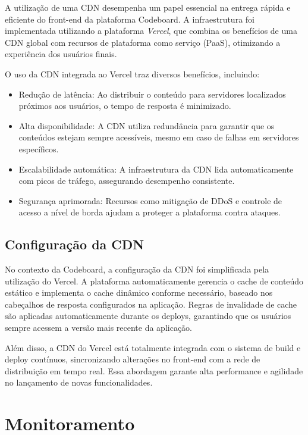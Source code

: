 A utilização de uma CDN desempenha um papel essencial na entrega rápida e eficiente do front-end da plataforma Codeboard. A infraestrutura foi implementada utilizando a plataforma \emph{Vercel}, que combina os benefícios de uma CDN global com recursos de plataforma como serviço (PaaS), otimizando a experiência dos usuários finais.

O uso da CDN integrada ao Vercel traz diversos benefícios, incluindo:

\begin{itemize}
    \item Redução de latência: Ao distribuir o conteúdo para servidores localizados próximos aos usuários, o tempo de resposta é minimizado.
    \item Alta disponibilidade: A CDN utiliza redundância para garantir que os conteúdos estejam sempre acessíveis, mesmo em caso de falhas em servidores específicos.
    \item Escalabilidade automática: A infraestrutura da CDN lida automaticamente com picos de tráfego, assegurando desempenho consistente.
    \item Segurança aprimorada: Recursos como mitigação de DDoS e controle de acesso a nível de borda ajudam a proteger a plataforma contra ataques.
\end{itemize}

\subsection{Configuração da CDN}

No contexto da Codeboard, a configuração da CDN foi simplificada pela utilização do Vercel. A plataforma automaticamente gerencia o cache de conteúdo estático e implementa o cache dinâmico conforme necessário, baseado nos cabeçalhos de resposta configurados na aplicação. Regras de invalidade de cache são aplicadas automaticamente durante os deploys, garantindo que os usuários sempre acessem a versão mais recente da aplicação.

Além disso, a CDN do Vercel está totalmente integrada com o sistema de build e deploy contínuos, sincronizando alterações no front-end com a rede de distribuição em tempo real. Essa abordagem garante alta performance e agilidade no lançamento de novas funcionalidades.


\section{Monitoramento}

